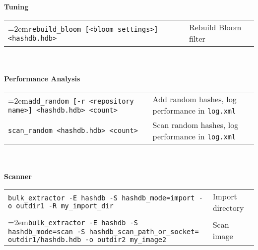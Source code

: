 \begin{small}
\begin{footnotesize}
\begin{tabular}{p{3.6 in} p{3.0 in}}
\end{tabular}
\\
\\
\textbf{Tuning}\\
\begin{tabular}{p{3.6 in} p{3.0 in}}
\hangindent=2em\texttt{rebuild\_bloom [<bloom settings>] <hashdb.hdb>} & Rebuild Bloom filter \\
\end{tabular}
\\
\\
\textbf{Performance Analysis}\\
\begin{tabular}{p{3.6 in} p{4 in}}
\hangindent=2em\texttt{add\_random [-r <repository name>] <hashdb.hdb> <count>} & Add random hashes, log performance in \texttt{log.xml}\\
\texttt{scan\_random <hashdb.hdb> <count>} & Scan random hashes, log performance in \texttt{log.xml}\\
\end{tabular}
\\
\\
\textbf{\bulk Scanner}\\
\begin{tabular}{p{5.6 in} p{2 in}}
\texttt{bulk\_extractor -E hashdb -S hashdb\_mode=import -o outdir1 -R my\_import\_dir} & Import directory\\
\hangindent=2em\texttt{bulk\_extractor -E hashdb -S hashdb\_mode=scan -S hashdb\_scan\_path\_or\_socket= outdir1/hashdb.hdb -o outdir2 my\_image2} & Scan image\\
\end{tabular}
\end{footnotesize}
\end{small}


